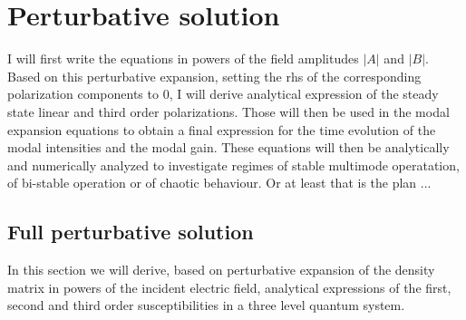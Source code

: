 \documentclass[preprint,secnumarabic,amssymb, nobibnotes, aip, prd]{revtex4-1}
\begin{document}
	
	\section{Perturbative solution}
	I will first write the equations in powers of the field amplitudes $|A|$ and $|B|$. Based on this perturbative expansion, setting the rhs of the corresponding polarization components to 0, I will derive analytical expression of the steady state linear and third order polarizations. Those will then be used in the modal expansion equations to obtain a final expression for the time evolution of the modal intensities and the modal gain. These equations will then be analytically and numerically analyzed to investigate regimes of stable multimode operatation, of bi-stable operation or of chaotic behaviour. Or at least that is the plan ... 
	
	
	
	
	\subsection{Full perturbative solution}
	In this section we will derive, based on perturbative expansion of the density matrix in powers of the incident electric field, analytical expressions of the first, second and third order susceptibilities in a three level quantum system. 
	
\end{document}
